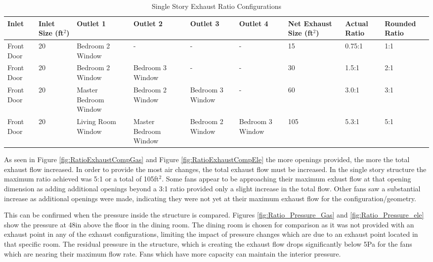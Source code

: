 \documentclass{article}
\begin{document}
\begin{table}[H]
	\centering
	\caption {Single Story Exhaust Ratio Configurations}
	\begin{tabular}{|C{.5in}|C{.6in}|C{.7in}|C{.7in}|C{.7in}|C{.7in}|C{.6in}|C{.5in}|C{.5in}|}
		\hline
		Inlet & Inlet Size (ft$^2$) & Outlet 1 & Outlet 2 & Outlet 3 & Outlet 4 & Net Exhaust Size (ft$^2$) & Actual Ratio & Rounded Ratio \\ \hline \hline
		Front Door & 20 & Bedroom 2 Window & - & - & - & 15 & 0.75:1 & 1:1 \\ \hline
		Front Door & 20 & Bedroom 2 Window & Bedroom 3 Window & - & - & 30 & 1.5:1 & 2:1 \\ \hline
		Front Door & 20 & Master Bedroom Window & Bedroom 2 Window & Bedroom 3 Window & - & 60 & 3.0:1 & 3:1 \\ \hline
		Front Door & 20 & Living Room Window & Master Bedroom Window & Bedroom 2 Window & Bedroom 3 Window & 105 & 5.3:1 & 5:1 \\ \hline
	\end{tabular}
	\label{table:RatioExhaustComp}
\end{table}

As seen in Figure \ref{fig:RatioExhaustCompGas} and Figure \ref{fig:RatioExhaustCompEle} the more openings provided, the more the total exhaust flow increased. In order to provide the most air changes, the total exhaust flow must be increased. In the single story structure the maximum ratio achieved was 5:1 or a total of 105ft$^2$. Some fans appear to be approaching their maximum exhust flow at that opening dimension as adding additional openings beyond a 3:1 ratio provided only a slight increase in the total flow. Other fans saw a substantial increase as additional openings were made, indicating they were not yet at their maximum exhaust flow for the configuration/geometry. 

This can be confirmed when the pressure inside the structure is compared. Figures \ref{fig:Ratio_Pressure_Gas} and \ref{fig:Ratio_Pressure_ele} show the pressure at 48in above the floor in the dining room. The dining room is chosen for comparison as it was not provided with an exhaust point in any of the exhaust configurations, limiting the impact of pressure changes which are due to an exhaust point located in that specific room. The residual pressure in the structure, which is creating the exhaust flow drops significantly below 5Pa for the fans which are nearing their maximum flow rate. Fans which have more capacity can maintain the interior pressure. 
\end{document}
